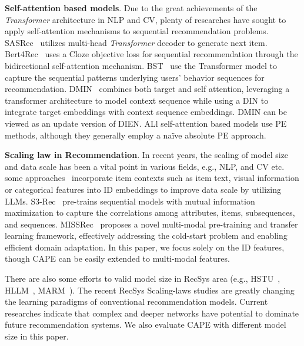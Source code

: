 \textbf{Self-attention based models}. Due to the great achievements of the \textit{Transformer} architecture in NLP and CV, plenty of researches have sought to apply self-attention mechanisms to sequential recommendation problems. SASRec~\cite{kang2018selfattentivesequentialrecommendation} utilizes multi-head \textit{Transformer} decoder to generate next item. Bert4Rec~\cite{bert4rec} uses a Cloze objective loss for sequential recommendation through the bidirectional self-attention mechanism. BST~\cite{chen2019behaviorsequencetransformerecommerce} use the Transformer model to capture the sequential patterns underlying users’ behavior sequences for recommendation. DMIN~\cite{10.1145/3340531.3412092} combines both target and self attention, leveraging a transformer architecture to model context sequence while using a DIN to integrate target embeddings with context sequence embeddings. DMIN can be viewed as an update version of DIEN. ALl self-attention based models use PE methods, although they generally employ a na\"ive absolute PE approach. 

\textbf{Scaling law in Recommendation}. In recent years, the scaling of model size and data scale has been a vital point in various fields, e.g., NLP, and CV etc. some approaches~\cite{10.1145/3340531.3411954,10.1145/3580305.3599519,10.1145/3581783.3611967} incorporate item contexts such as item text, visual information or categorical features into ID embeddings to improve data scale by utilizing LLMs. S3-Rec~\cite{10.1145/3340531.3411954} pre-trains sequential models with mutual information maximization to capture the correlations among attributes, items, subsequences, and sequences. MISSRec~\cite{10.1145/3581783.3611967} proposes a novel multi-modal pre-training and transfer learning framework, effectively addressing the cold-start problem and enabling efficient domain adaptation. In this paper, we focus solely on the ID features, though CAPE can be easily extended to multi-modal features. 

There are also some efforts to valid model size in RecSys area (e.g., HSTU~\cite{zhai2024hstu}, HLLM~\cite{chen2024hllmenhancingsequentialrecommendations}, MARM~\cite{lv2024marmunlockingfuturerecommendation}). The recent RecSys Scaling-laws studies are greatly changing the learning paradigms of conventional recommendation models. Current researches indicate that complex and deeper networks have potential to dominate future recommendation systems. We also evaluate CAPE with different model size in this paper.



